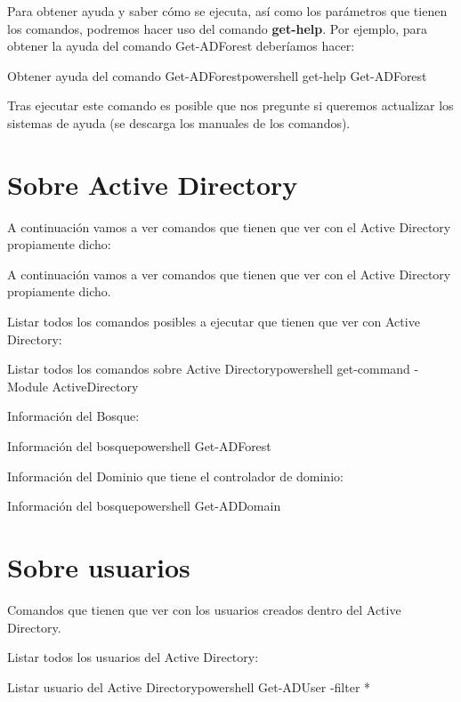 Para obtener ayuda y saber cómo se ejecuta, así como los parámetros que tienen los comandos, podremos hacer uso del comando \textbf{get-help}. Por ejemplo, para obtener la ayuda del comando Get-ADForest deberíamos hacer:

\begin{mycode}{Obtener ayuda del comando Get-ADForest}{powershell}{}
get-help Get-ADForest
\end{mycode}

Tras ejecutar este comando es posible que nos pregunte si queremos actualizar los sistemas de ayuda (se descarga los manuales de los comandos).

\section{Sobre Active Directory}

A continuación  vamos a ver comandos que tienen que ver con el Active Directory propiamente dicho:

A continuación  vamos a ver comandos que tienen que ver con el Active Directory propiamente dicho.

Listar todos los comandos posibles a ejecutar que tienen que ver con Active Directory:


\begin{mycode}{Listar todos los comandos sobre Active Directory}{powershell}{}
get-command -Module ActiveDirectory
\end{mycode}


Información del Bosque:
\begin{mycode}{Información del bosque}{powershell}{}
Get-ADForest
\end{mycode}


Información del Dominio que tiene el controlador de dominio:
\begin{mycode}{Información del bosque}{powershell}{}
Get-ADDomain
\end{mycode}


\section{Sobre usuarios}

Comandos que tienen que ver con los usuarios creados dentro del Active Directory.

Listar todos los usuarios del Active Directory:
\begin{mycode}{Listar usuario del Active Directory}{powershell}{}
Get-ADUser -filter *
\end{mycode}

